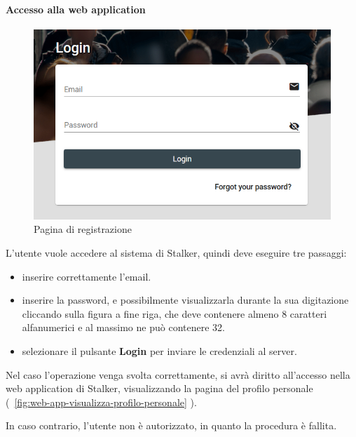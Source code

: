 \documentclass[../manuale-utente.tex]{subfiles}
\begin{document}
\paragraph{Accesso alla web application}%
\label{par:accesso-alla-web-application}

\begin{figure}[H]
    \centering
    \includegraphics[width=120mm]{img/web-app/accesso-web-app.png}
    \caption{Pagina di registrazione}%
    \label{fig:web-app-accesso}
\end{figure}

L'utente vuole accedere al sistema di Stalker, quindi deve eseguire tre passaggi:
\begin{itemize}
    \item inserire correttamente l'email.
    \item inserire la password, e possibilmente visualizzarla durante la sua digitazione cliccando sulla figura a fine riga, che deve contenere almeno 8 caratteri alfanumerici e al massimo ne può contenere 32.
    \item selezionare il pulsante \textbf{Login} per inviare le credenziali al server.
\end{itemize} 

Nel caso l'operazione venga svolta correttamente, si avrà diritto all'accesso nella web application di Stalker, visualizzando la pagina del profilo personale (~\ref{fig:web-app-visualizza-profilo-personale} ).

In caso contrario, l'utente non è autorizzato, in quanto la procedura è fallita.
\end{document}
